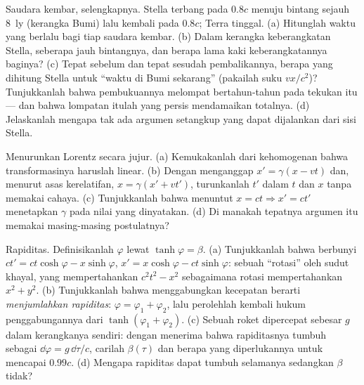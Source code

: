 \begin{exercise}[$\star\star\star$]\label{exo:b3:relativistic-kinematics:10}
Saudara kembar, selengkapnya. Stella terbang pada $0.8c$ menuju bintang
sejauh \qty{8}{ly} (kerangka Bumi) lalu kembali pada $0.8c$; Terra
tinggal. (a) Hitunglah waktu yang berlalu bagi tiap saudara kembar. (b)
Dalam kerangka keberangkatan Stella, seberapa jauh bintangnya, dan
berapa lama kaki keberangkatannya baginya? (c) Tepat sebelum dan tepat
sesudah pembalikannya, berapa yang dihitung Stella untuk ``waktu di Bumi
sekarang'' (pakailah suku $vx/c^2$)? Tunjukkanlah bahwa pembukuannya
melompat bertahun-tahun pada tekukan itu --- dan bahwa lompatan itulah
yang persis mendamaikan totalnya. (d) Jelaskanlah mengapa tak ada
argumen setangkup yang dapat dijalankan dari sisi Stella.
\end{exercise}

\begin{exercise}[$\star\star\star$]\label{exo:b3:relativistic-kinematics:11}
Menurunkan Lorentz secara jujur. (a) Kemukakanlah dari kehomogenan bahwa
transformasinya haruslah linear. (b) Dengan menganggap $x' = \gamma(x - vt)$
dan, menurut asas kerelatifan, $x = \gamma(x' + vt')$, turunkanlah $t'$
dalam $t$ dan $x$ tanpa memakai cahaya. (c) Tunjukkanlah bahwa menuntut
$x = ct \Rightarrow x' = ct'$ menetapkan $\gamma$ pada nilai yang
dinyatakan. (d) Di manakah tepatnya argumen itu memakai masing-masing
postulatnya?
\end{exercise}

\begin{exercise}[$\star\star\star$]\label{exo:b3:relativistic-kinematics:12}
Rapiditas. Definisikanlah $\varphi$ lewat $\tanh\varphi = \beta$. (a)
Tunjukkanlah bahwa  berbunyi
$ct' = ct\cosh\varphi - x\sinh\varphi$,
$x' = x\cosh\varphi - ct\sinh\varphi$: sebuah ``rotasi'' oleh sudut
khayal, yang mempertahankan $c^2t^2 - x^2$ sebagaimana rotasi
mempertahankan $x^2 + y^2$. (b) Tunjukkanlah bahwa menggabungkan
kecepatan berarti \emph{menjumlahkan rapiditas}: $\varphi =
\varphi_1 + \varphi_2$, lalu perolehlah kembali hukum penggabungannya
dari $\tanh(\varphi_1 + \varphi_2)$. (c) Sebuah roket dipercepat sebesar
$g$ dalam kerangkanya sendiri: dengan menerima bahwa rapiditasnya tumbuh
sebagai $\dd\varphi = g\,
\dd\tau/c$, carilah $\beta(\tau)$ dan berapa  yang
diperlukannya untuk mencapai $0.99c$. (d) Mengapa rapiditas dapat tumbuh
selamanya sedangkan $\beta$ tidak?
\end{exercise}

